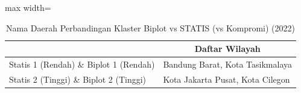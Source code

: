 \begin{table}[H]
\centering
\caption{Nama Daerah Perbandingan Klaster Biplot vs STATIS (vs Kompromi) (2022)} \label{tab:sample1biplot_statis_name_2022}
\begin{adjustbox}{max width=\textwidth}
\begin{tabular}{|>{\centering\arraybackslash}p{4cm}|p{10cm}|}
\hline
\multicolumn{1}{|c|}{\textbf{Kategori}} & \multicolumn{1}{c|}{\textbf{Daftar Wilayah}} \\
\hline
Statis 1 (Rendah) \& Biplot 1 (Rendah) & Bandung Barat, Kota Tasikmalaya \\
\hline
Statis 2 (Tinggi) \& Biplot 2 (Tinggi) & Kota Jakarta Pusat, Kota Cilegon \\
\hline
\end{tabular}
\end{adjustbox}
\end{table}
